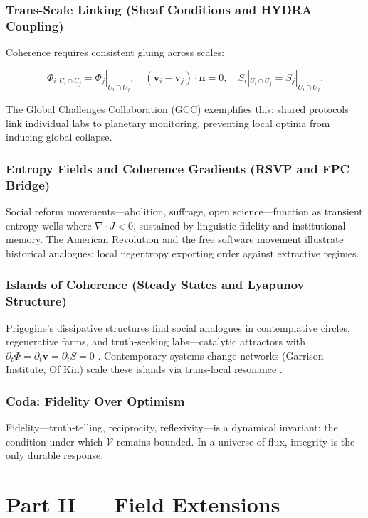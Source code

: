 \documentclass[12pt,a4paper]{article}
\begin{document}
\section{Trans-Scale Linking (Sheaf Conditions and HYDRA Coupling)}
Coherence requires consistent gluing across scales:

\begin{equation}
\Phi_i|_{U_i\cap U_j} = \Phi_j|_{U_i\cap U_j}, \quad (\bm{v}_i - \bm{v}_j)\!\cdot\!\bm{n} = 0, \quad S_i|_{U_i\cap U_j} = S_j|_{U_i\cap U_j}.
\label{eq:sheaf}
\end{equation}

The Global Challenges Collaboration (GCC) exemplifies this: shared protocols link individual labs to planetary monitoring, preventing local optima from inducing global collapse.

\section{Entropy Fields and Coherence Gradients (RSVP and FPC Bridge)}
Social reform movements—abolition, suffrage, open science—function as transient entropy wells where $\nabla\!\cdot\!J < 0$, sustained by linguistic fidelity and institutional memory. The American Revolution and the free software movement illustrate historical analogues: local negentropy exporting order against extractive regimes.

\section{Islands of Coherence (Steady States and Lyapunov Structure)}
Prigogine’s dissipative structures find social analogues in contemplative circles, regenerative farms, and truth-seeking labs—catalytic attractors with $\partial_t \Phi = \partial_t \bm{v} = \partial_t S = 0$ \cite{prigogine1984order}. Contemporary systems-change networks (Garrison Institute, Of Kin) scale these islands via trans-local resonance \cite{mcdougall2022islands}.

\section*{Coda: Fidelity Over Optimism}
Fidelity—truth-telling, reciprocity, reflexivity—is a dynamical invariant: the condition under which $\mathcal{V}$ remains bounded. In a universe of flux, integrity is the only durable response.

\clearpage
\part{Part II — Field Extensions}
\end{document}
